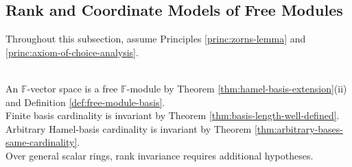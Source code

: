 \subsection{Rank and Coordinate Models of Free Modules}

Throughout this subsection, assume Principles \ref{princ:zorns-lemma} and \ref{princ:axiom-of-choice-analysis}.

\begin{perspective} \label{per:dimension-as-field-case-of-rank} \\
An $\mathbb{F}$-vector space is a free $\mathbb{F}$-module by Theorem \ref{thm:hamel-basis-extension}(ii) and Definition \ref{def:free-module-basis}.\\
Finite basis cardinality is invariant by Theorem \ref{thm:basis-length-well-defined}. Arbitrary Hamel-basis cardinality is invariant by Theorem \ref{thm:arbitrary-bases-same-cardinality}.\\
Over general scalar rings, rank invariance requires additional hypotheses.
\end{perspective}


